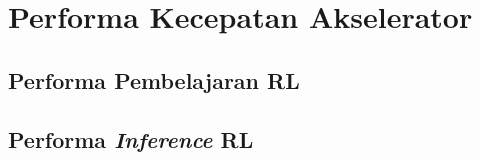 \section{Performa Kecepatan Akselerator}
\subsection{Performa Pembelajaran \acl{RL}}
\subsection{Performa \textit{Inference} \acl{RL}}
